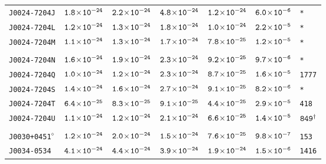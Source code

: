 \begin{longtable}{l | c | c | c | c | c | l}
\scriptsize{\tt{J0024-7204J}} & \scriptsize{$\tt{1.8\!\times\!10^{-24}}$} & \scriptsize{$\tt{2.2\!\times\!10^{-24}}$} & \scriptsize{$\tt{4.8\!\times\!10^{-24}}$} & \scriptsize{$\tt{1.2\!\times\!10^{-24}}$} & \scriptsize{$\tt{6.0\!\times\!10^{-6}}$} & \scriptsize{\tt{*}} \\[-16pt] 
\scriptsize{\tt{J0024-7204L}} & \scriptsize{$\tt{1.2\!\times\!10^{-24}}$} & \scriptsize{$\tt{1.3\!\times\!10^{-24}}$} & \scriptsize{$\tt{1.8\!\times\!10^{-24}}$} & \scriptsize{$\tt{1.0\!\times\!10^{-24}}$} & \scriptsize{$\tt{2.2\!\times\!10^{-5}}$} & \scriptsize{\tt{*}} \\[-16pt] 
\scriptsize{\tt{J0024-7204M}} & \scriptsize{$\tt{1.1\!\times\!10^{-24}}$} & \scriptsize{$\tt{1.3\!\times\!10^{-24}}$} & \scriptsize{$\tt{1.7\!\times\!10^{-24}}$} & \scriptsize{$\tt{7.8\!\times\!10^{-25}}$} & \scriptsize{$\tt{1.2\!\times\!10^{-5}}$} & \scriptsize{\tt{*}} \\[-16pt] 
\\[-20pt] 
\scriptsize{\tt{J0024-7204N}} & \scriptsize{$\tt{1.6\!\times\!10^{-24}}$} & \scriptsize{$\tt{1.9\!\times\!10^{-24}}$} & \scriptsize{$\tt{2.3\!\times\!10^{-24}}$} & \scriptsize{$\tt{9.2\!\times\!10^{-25}}$} & \scriptsize{$\tt{9.7\!\times\!10^{-6}}$} & \scriptsize{\tt{*}} \\[-16pt] 
\scriptsize{\tt{J0024-7204Q}} & \scriptsize{$\tt{1.0\!\times\!10^{-24}}$} & \scriptsize{$\tt{1.2\!\times\!10^{-24}}$} & \scriptsize{$\tt{2.3\!\times\!10^{-24}}$} &\scriptsize{$\tt{8.7\!\times\!10^{-25}}$} & \scriptsize{$\tt{1.6\!\times\!10^{-5}}$} & \scriptsize{\tt{1777}} \\[-16pt] 
\scriptsize{\tt{J0024-7204S}} & \scriptsize{$\tt{1.4\!\times\!10^{-24}}$} & \scriptsize{$\tt{1.6\!\times\!10^{-24}}$} & \scriptsize{$\tt{2.7\!\times\!10^{-24}}$} & \scriptsize{$\tt{9.1\!\times\!10^{-25}}$} & \scriptsize{$\tt{8.2\!\times\!10^{-6}}$} & \scriptsize{\tt{*}} \\[-16pt] 
\scriptsize{\tt{J0024-7204T}} & \scriptsize{$\tt{6.4\!\times\!10^{-25}}$} & \scriptsize{$\tt{8.3\!\times\!10^{-25}}$} & \scriptsize{$\tt{9.1\!\times\!10^{-25}}$} &\scriptsize{$\tt{4.4\!\times\!10^{-25}}$} & \scriptsize{$\tt{2.9\!\times\!10^{-5}}$} & \scriptsize{\tt{418}} \\[-16pt] 
\scriptsize{\tt{J0024-7204U}} & \scriptsize{$\tt{1.1\!\times\!10^{-24}}$} & \scriptsize{$\tt{1.2\!\times\!10^{-24}}$} & \scriptsize{$\tt{2.1\!\times\!10^{-24}}$} & \scriptsize{$\tt{6.6\!\times\!10^{-25}}$} & \scriptsize{$\tt{1.4\!\times\!10^{-5}}$} & \scriptsize{$\tt{849^{\dagger}}$} \\[-16pt] 
\\[-20pt] 
\scriptsize{\tt{J0030+0451}$^{\diamond}$} & \scriptsize{$\tt{1.2\!\times\!10^{-24}}$} &
\scriptsize{$\tt{2.0\!\times\!10^{-24}}$} & \scriptsize{$\tt{1.5\!\times\!10^{-24}}$} &\scriptsize{$\tt{7.6\!\times\!10^{-25}}$} &
\scriptsize{$\tt{9.8\!\times\!10^{-7}}$} & \scriptsize{\tt{153}} \\[-16pt] 
\scriptsize{\tt{J0034-0534}} & \scriptsize{$\tt{4.1\!\times\!10^{-24}}$} & \scriptsize{$\tt{4.4\!\times\!10^{-24}}$} & \scriptsize{$\tt{3.9\!\times\!10^{-24}}$} &\scriptsize{$\tt{1.9\!\times\!10^{-24}}$} & \scriptsize{$\tt{1.5\!\times\!10^{-6}}$} & \scriptsize{\tt{1416}} \\[-16pt] 

\end{longtable}

